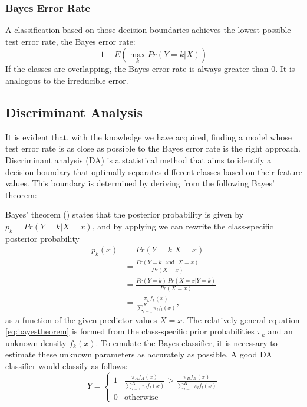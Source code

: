 \documentclass[12pt,a4paper,titlepage]{article}
\numberwithin{equation}{section}
\numberwithin{table}{section}
\numberwithin{figure}{section}
\begin{document}
        \subsubsection{Bayes Error Rate}
        A classification based on those decision boundaries achieves the lowest possible test error rate, the Bayes error rate:
        \begin{equation}
        1 - E(\max_k Pr(Y=k|X))
        \end{equation}
        If the classes are overlapping, the Bayes error rate is always greater than $0$. It is analogous to the irreducible error.
    
    \subsection{Discriminant Analysis}\label{DA}
    It is evident that, with the knowledge we have acquired, finding a model whose test error rate is as close as possible to the Bayes error rate is the right approach. Discriminant analysis (DA) is a statistical method that aims to identify a decision boundary that optimally separates different classes based on their feature values. This boundary is determined by deriving from the following Bayes' theorem:
    
    \noindent Bayes' theorem (\cite{sep-bayes-theorem}) states that the posterior probability is given by $p_k = Pr(Y=k|X=x)$, and by applying we can rewrite the class-specific posterior probability
    \begin{align}
    \label{eq:bayestheorem}
        p_k(x)
        & = Pr(Y=k|X=x) \nonumber\\
        & = \frac{Pr(Y=k\;\text{ and }\;X=x)}{Pr(X=x)} \nonumber\\
        & = \frac{Pr(Y=k)\,Pr(X=x|Y=k)}{Pr(X=x)} \nonumber\\
        & = \frac{\pi_k f_k(x)}{\sum_{l=1}^K\pi_l f_l(x)},
    \end{align}
    as a function of the given predictor values $X=x$. The relatively general equation \ref{eq:bayestheorem} is formed from the class-specific prior probabilities $\pi_k$ and an unknown density $f_k(x)$. To emulate the Bayes classifier, it is necessary to estimate these unknown parameters as accurately as possible. A good DA classifier would classify as follows:
    \begin{equation}
    Y=\begin{cases}
    1 & \frac{\pi_A f_A(x)}{\sum_{l=1}^K\pi_l f_l(x)} > \frac{\pi_B f_B(x)}{\sum_{l=1}^K\pi_l f_l(x)} \\
    0 & \text{otherwise}
    \end{cases}
    \end{equation}
    
\end{document}
